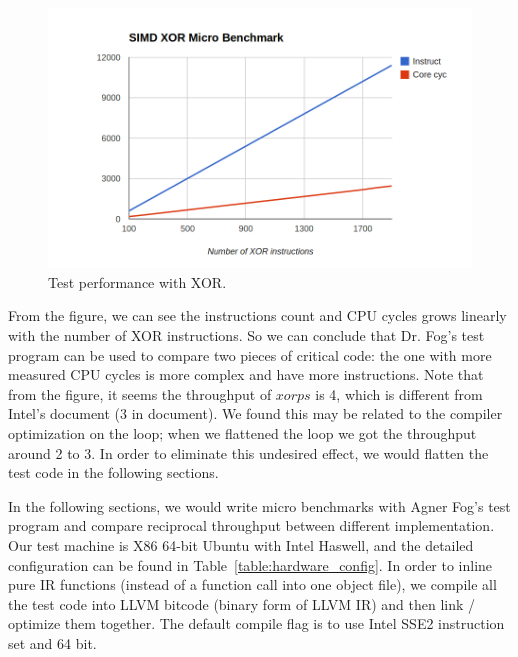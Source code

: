 \begin{figure}[ht!]
\centering
\includegraphics[width=140mm]{draw/testp_xor.png}
\caption[Test Performance with XOR]{Test performance with XOR\@.}
\label{figure:testp_xor}
\end{figure}

From the figure, we can see the instructions count and CPU cycles grows linearly with the number of XOR instructions. So we can conclude that Dr. Fog's test program can be used to compare two pieces of critical code: the one with more measured CPU cycles is more complex and have more instructions. Note that from the figure, it seems the throughput of $xorps$ is 4, which is different from Intel's document (3 in document). We found this may be related to the compiler optimization on the loop; when we flattened the loop we got the throughput around 2 to 3. In order to eliminate this undesired effect, we would flatten the test code in the following sections.

In the following sections, we would write micro benchmarks with Agner Fog's test program and compare reciprocal throughput between different implementation. Our test machine is X86 64-bit Ubuntu with Intel Haswell, and the detailed configuration can be found in Table~\ref{table:hardware_config}. In order to inline pure IR functions (instead of a function call into one object file), we compile all the test code into LLVM bitcode (binary form of LLVM IR) and then link / optimize them together. The default compile flag is to use Intel SSE2 instruction set and 64 bit.

